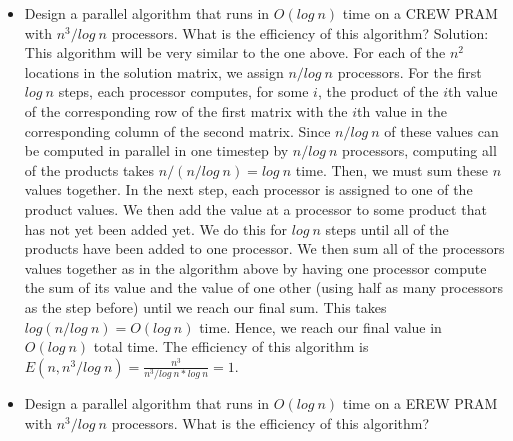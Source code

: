 \documentclass{article}
\begin{document}
\begin{enumerate}
\begin{itemize}
\newline
\item Design a parallel algorithm that runs in $O(log\ n)$ time on a CREW PRAM with $n^3/log\ n$  processors. What is the efficiency of this algorithm?
\newline
\newline Solution:  This algorithm will be very similar to the one above. For each of the $n^2$ locations in the solution matrix, we assign $n/log\ n$ processors. For the first $log\ n$ steps, each processor computes, for some $i$, the product of the $i$th value of the corresponding row of the first matrix with the $i$th value in the corresponding column of the second matrix. Since $n/log\ n$ of these values can be computed in parallel in one timestep by $n/log\ n$ processors, computing all of the products takes $n/(n/log\ n)=log\ n$ time. Then, we must sum these $n$ values together. In the next step, each processor is assigned to one of the product values. We then add the value at a processor to some product that has not yet been added yet. We do this for $log\ n$ steps until all of the products have been added to one processor. We then sum all of the processors values together as in the algorithm above by having one processor compute the sum of its value and the value of one other (using half as many processors as the step before) until we reach our final sum. This takes $log(n/log\ n)=O(log\ n)$ time. Hence, we reach our final value in $O(log\ n)$ total time. The efficiency of this algorithm is $E(n,n^3/log\ n)=\frac{n^3}{n^3/log\ n*log\ n}=1$.
\newline
\item Design a parallel algorithm that runs in $O(log\ n)$ time on a EREW PRAM with $n^3/log\ n$  processors. What is the efficiency of this algorithm? 
\newline

\end{itemize}
\end{enumerate}
\end{document}
